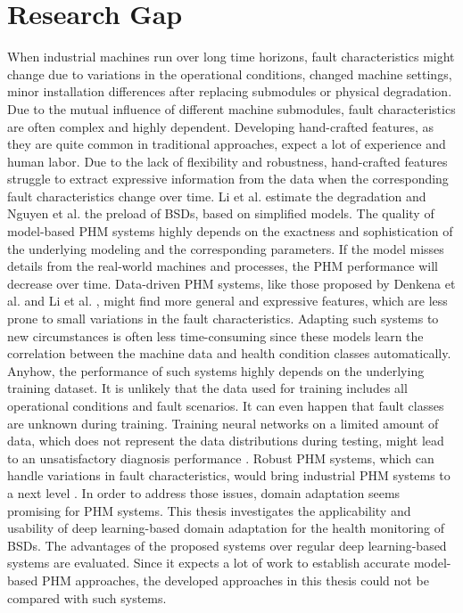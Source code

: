 \section{Research Gap}
When industrial machines run over long time horizons, fault characteristics might change due to variations in the operational conditions, changed machine settings, minor installation differences after replacing submodules or physical degradation. Due to the mutual influence of different machine submodules, fault characteristics are often complex and highly dependent. Developing hand-crafted features, as they are quite common in traditional approaches, expect a lot of experience and human labor. Due to the lack of flexibility and robustness, hand-crafted features struggle to extract expressive information from the data when the corresponding fault characteristics change over time. Li et al. \cite{Lee2015} estimate the degradation and Nguyen et al. \cite{NGUYEN2019} the preload of BSDs, based on simplified models. The quality of model-based PHM systems highly depends on the exactness and sophistication of the underlying modeling and the corresponding parameters. If the model misses details from the real-world machines and processes, the PHM performance will decrease over time. Data-driven PHM systems, like those proposed by Denkena et al. \cite{Denkena2021} and Li et al. \cite{LiPin2018}, might find more general and expressive features, which are less prone to small variations in the fault characteristics. Adapting such systems to new circumstances is often less time-consuming since these models learn the correlation between the machine data and health condition classes automatically. Anyhow, the performance of such systems highly depends on the underlying training dataset. It is unlikely that the data used for training includes all operational conditions and fault scenarios. It can even happen that fault classes are unknown during training. Training neural networks on a limited amount of data, which does not represent the data distributions during testing, might lead to an unsatisfactory diagnosis performance \cite{AZAMFAR2020103932}. Robust PHM systems, which can handle variations in fault characteristics, would bring industrial PHM systems to a next level \cite{Michau2017}. In order to address those issues, domain adaptation seems promising for PHM systems. This thesis investigates the applicability and usability of deep learning-based domain adaptation for the health monitoring of BSDs. The advantages of the proposed systems over regular deep learning-based systems are evaluated. Since it expects a lot of work to establish accurate model-based PHM approaches, the developed approaches in this thesis could not be compared with such systems. 